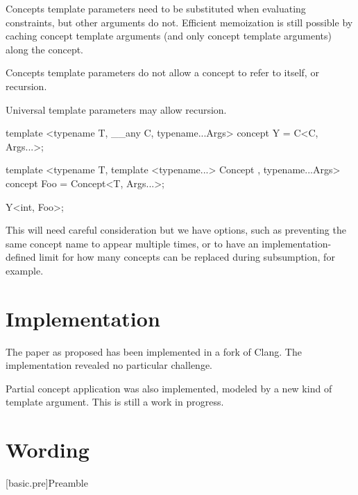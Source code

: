 \documentclass{wg21}
\begin{document}
Concepts template parameters need to be substituted when evaluating constraints, but other arguments do not.
Efficient memoization is still possible by caching concept template arguments (and only concept template arguments) along the concept.

Concepts template parameters do not allow a concept to refer to itself, or recursion.

Universal template parameters may allow recursion.

\begin{colorblock}
template <typename T, __any C, typename...Args>
concept Y = C<C, Args...>;

template <typename T, template <typename...> Concept , typename...Args>
concept Foo = Concept<T, Args...>;

Y<int, Foo>;
\end{colorblock}

This will need careful consideration but we have options, such as preventing the same concept name to appear multiple times,
or to have an implementation-defined limit for how many concepts can be replaced during subsumption, for example.

\section{Implementation}

The paper as proposed has been implemented in a fork of Clang.
The implementation revealed no particular challenge.

Partial concept application was also implemented, modeled by a new kind of template argument.
This is still a work in progress.

\section{Wording}

[basic.pre]{Preamble}
\end{document}
